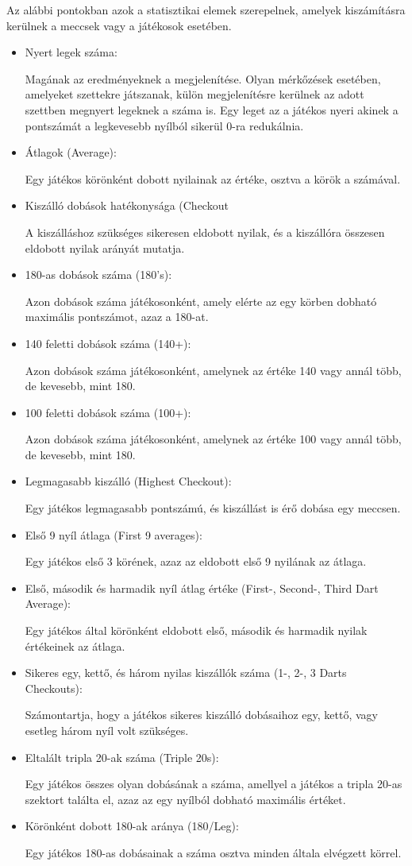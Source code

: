 Az alábbi pontokban azok a statisztikai elemek szerepelnek, amelyek kiszámításra kerülnek a meccsek vagy a játékosok esetében.

\begin{itemize}
\item Nyert legek száma:

Magának az eredményeknek a megjelenítése. Olyan mérkőzések esetében, amelyeket szettekre játszanak, külön megjelenítésre kerülnek az adott szettben megnyert legeknek a száma is. Egy leget az a játékos nyeri akinek a pontszámát a legkevesebb nyílból sikerül 0-ra redukálnia.
\item Átlagok (Average):

Egy játékos körönként dobott nyilainak az értéke, osztva a körök a számával.
\item Kiszálló dobások hatékonysága (Checkout%

A kiszálláshoz szükséges sikeresen eldobott nyilak, és a kiszállóra összesen eldobott nyilak arányát mutatja.
\item 180-as dobások száma (180's):

Azon dobások száma játékosonként, amely elérte az egy körben dobható maximális pontszámot, azaz a 180-at.
\item 140 feletti dobások száma (140+):

Azon dobások száma játékosonként, amelynek az értéke 140 vagy annál több, de kevesebb, mint 180.
\item 100 feletti dobások száma (100+):

Azon dobások száma játékosonként, amelynek az értéke 100 vagy annál több, de kevesebb, mint 180.
\item Legmagasabb kiszálló (Highest Checkout):

Egy játékos legmagasabb pontszámú, és kiszállást is érő dobása egy meccsen.
\item Első 9 nyíl átlaga (First 9 averages):

Egy játékos első 3 körének, azaz az eldobott első 9 nyilának az átlaga.
\item Első, második és harmadik nyíl átlag értéke (First-, Second-, Third Dart Average):

Egy játékos által körönként eldobott első, második és harmadik nyilak értékeinek az átlaga.
\item Sikeres egy, kettő, és három nyilas kiszállók száma (1-, 2-, 3 Darts Checkouts):

Számontartja, hogy a játékos sikeres kiszálló dobásaihoz egy, kettő, vagy esetleg három nyíl volt szükséges.
\item Eltalált tripla 20-ak száma (Triple 20s):

Egy játékos összes olyan dobásának a száma, amellyel a játékos a tripla 20-as szektort találta el, azaz az egy nyílból dobható maximális értéket.

\item Körönként dobott 180-ak aránya (180/Leg):

Egy játékos 180-as dobásainak a száma osztva minden általa elvégzett körrel.

\end{itemize}

